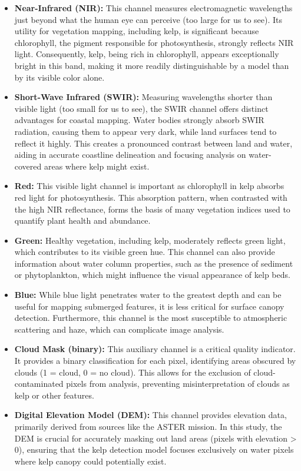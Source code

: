 \documentclass{article}
\begin{document}
\begin{itemize}
    \item \textbf{Near-Infrared (NIR):} This channel measures electromagnetic wavelengths just beyond what the human eye can perceive (too large for us to see). Its utility for vegetation mapping, including kelp, is significant because chlorophyll, the pigment responsible for photosynthesis, strongly reflects NIR light. Consequently, kelp, being rich in chlorophyll, appears exceptionally bright in this band, making it more readily distinguishable by a model than by its visible color alone.

    \item \textbf{Short-Wave Infrared (SWIR):} Measuring wavelengths shorter than visible light (too small for us to see), the SWIR channel offers distinct advantages for coastal mapping. Water bodies strongly absorb SWIR radiation, causing them to appear very dark, while land surfaces tend to reflect it highly. This creates a pronounced contrast between land and water, aiding in accurate coastline delineation and focusing analysis on water-covered areas where kelp might exist.

    \item \textbf{Red:} This visible light channel is important as chlorophyll in kelp absorbs red light for photosynthesis. This absorption pattern, when contrasted with the high NIR reflectance, forms the basis of many vegetation indices used to quantify plant health and abundance.

    \item \textbf{Green:} Healthy vegetation, including kelp, moderately reflects green light, which contributes to its visible green hue. This channel can also provide information about water column properties, such as the presence of sediment or phytoplankton, which might influence the visual appearance of kelp beds.

    \item \textbf{Blue:} While blue light penetrates water to the greatest depth and can be useful for mapping submerged features, it is less critical for surface canopy detection. Furthermore, this channel is the most susceptible to atmospheric scattering and haze, which can complicate image analysis.

    \item \textbf{Cloud Mask (binary):} This auxiliary channel is a critical quality indicator. It provides a binary classification for each pixel, identifying areas obscured by clouds (1 = cloud, 0 = no cloud). This allows for the exclusion of cloud-contaminated pixels from analysis, preventing misinterpretation of clouds as kelp or other features.

    \item \textbf{Digital Elevation Model (DEM):} This channel provides elevation data, primarily derived from sources like the ASTER mission. In this study, the DEM is crucial for accurately masking out land areas (pixels with elevation > 0), ensuring that the kelp detection model focuses exclusively on water pixels where kelp canopy could potentially exist.
\end{itemize}
\end{document}
